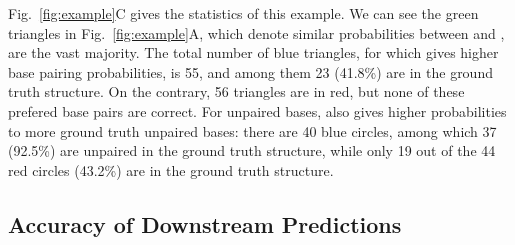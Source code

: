 Fig.~\ref{fig:example}C gives the statistics of this example.
We can see the green triangles in Fig.~\ref{fig:example}A, 
which denote similar %
probabilities between \rnafold and \linearpartition, 
are the vast majority. %
The total number of blue triangles,
for which \linearpartition gives higher base pairing probabilities,
is 55,
and among them 23 %
(41.8\%) are in the ground truth structure.
On the contrary,
56 triangles are in red,
but none of these \rnafold prefered base pairs are correct. %
For unpaired bases, 
\linearpartition also gives higher probabilities to more ground truth unpaired bases:
there are 40 blue circles,
among which 37 (92.5\%) are unpaired in the ground truth structure,
while only 19 out of the 44 red circles (43.2\%) are in the ground truth structure.


\vspace{-0.3cm}
\subsection{Accuracy of Downstream Predictions}%
\label{sec:acc}




